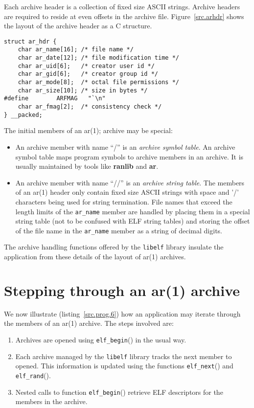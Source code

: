 \documentclass[a4paper]{book}
\newcommand{\function}[1]{\texttt{#1}()}
\newcommand{\firstterm}[1]{\textit{#1}}                 %
\newcommand{\library}[1]{\texttt{#1}}
\newcommand{\parameter}[1]{\texttt{#1}}
\newcommand{\tool}[1]{\textbf{#1}}
\begin{document}
Each archive header is a collection of fixed size ASCII strings.
Archive headers are required to reside at even offsets in the archive
file.  Figure~\vref{src.arhdr} shows the layout of the archive header
as a C structure.

\begin{lstlisting}[caption=Archive Header Layout, label=src.arhdr]
struct ar_hdr {
    char ar_name[16]; /* file name */
    char ar_date[12]; /* file modification time */
    char ar_uid[6];   /* creator user id */
    char ar_gid[6];   /* creator group id */
    char ar_mode[8];  /* octal file permissions */
    char ar_size[10]; /* size in bytes */
#define        ARFMAG   "`\n"
    char ar_fmag[2];  /* consistency check */
} __packed;
\end{lstlisting}

The initial members of an ar(1); archive may be special:

\begin{itemize}
\item An archive member with name ``/'' is an \firstterm{archive
  symbol table}.  An archive symbol table maps program symbols to
  archive members in an archive.  It is usually maintained by tools
  like \tool{ranlib} and \tool{ar}.
\item An archive member with name ``//'' is an \firstterm{archive
  string table}.  The members of an ar(1) header only contain
  fixed size ASCII strings with space and '/' characters being used
  for string termination.  File names that exceed the length limits of
  the \parameter{ar\_name} member are handled by placing them in a
  special string table (not to be confused with ELF string tables) and
  storing the offset of the file name in the \parameter{ar\_name}
  member as a string of decimal digits.
\end{itemize}

The archive handling functions offered by the \library{libelf} library
insulate the application from these details of the layout of
ar(1) archives.

\section{Stepping through an ar(1) archive}

We now illustrate (listing~\vref{src.prog.6}) how an application may
iterate through the members of an ar(1) archive.  The steps
involved are:

\begin{enumerate}
\item Archives are opened using \function{elf\_begin} in the usual way.
\item Each archive managed by the \library{libelf} library tracks the
  next member to opened.  This information is updated using the
  functions \function{elf\_next} and \function{elf\_rand}.
\item Nested calls to function \function{elf\_begin} retrieve ELF
  descriptors for the members in the archive.
\end{enumerate}
\end{document}
